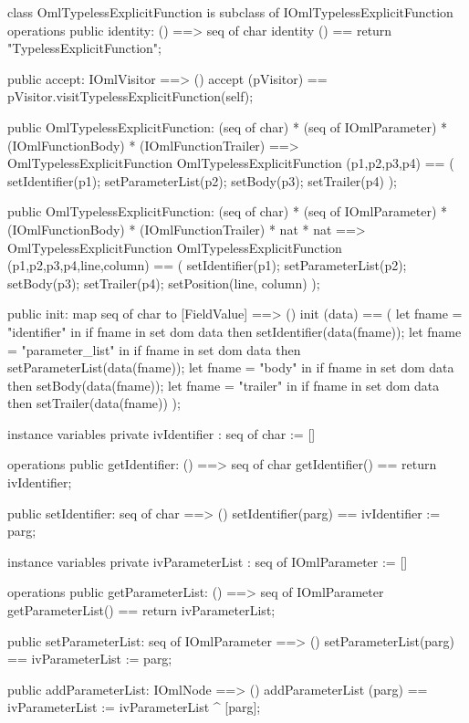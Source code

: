 \begin{vdm_al}
class OmlTypelessExplicitFunction is subclass of IOmlTypelessExplicitFunction
operations
  public identity: () ==> seq of char
  identity () == return "TypelessExplicitFunction";

  public accept: IOmlVisitor ==> ()
  accept (pVisitor) == pVisitor.visitTypelessExplicitFunction(self);

  public OmlTypelessExplicitFunction:
    (seq of char) *
    (seq of IOmlParameter) *
    (IOmlFunctionBody) *
    (IOmlFunctionTrailer) ==> OmlTypelessExplicitFunction
  OmlTypelessExplicitFunction (p1,p2,p3,p4) == 
    ( setIdentifier(p1);
      setParameterList(p2);
      setBody(p3);
      setTrailer(p4) );

  public OmlTypelessExplicitFunction:
    (seq of char) *
    (seq of IOmlParameter) *
    (IOmlFunctionBody) *
    (IOmlFunctionTrailer) *
    nat *
    nat ==> OmlTypelessExplicitFunction
  OmlTypelessExplicitFunction (p1,p2,p3,p4,line,column) == 
    ( setIdentifier(p1);
      setParameterList(p2);
      setBody(p3);
      setTrailer(p4);
      setPosition(line, column) );

  public init: map seq of char to [FieldValue] ==> ()
  init (data) ==
    ( let fname = "identifier" in
        if fname in set dom data
        then setIdentifier(data(fname));
      let fname = "parameter_list" in
        if fname in set dom data
        then setParameterList(data(fname));
      let fname = "body" in
        if fname in set dom data
        then setBody(data(fname));
      let fname = "trailer" in
        if fname in set dom data
        then setTrailer(data(fname)) );

instance variables
  private ivIdentifier : seq of char := []

operations
  public getIdentifier: () ==> seq of char
  getIdentifier() == return ivIdentifier;

  public setIdentifier: seq of char ==> ()
  setIdentifier(parg) == ivIdentifier := parg;

instance variables
  private ivParameterList : seq of IOmlParameter := []

operations
  public getParameterList: () ==> seq of IOmlParameter
  getParameterList() == return ivParameterList;

  public setParameterList: seq of IOmlParameter ==> ()
  setParameterList(parg) == ivParameterList := parg;

  public addParameterList: IOmlNode ==> ()
  addParameterList (parg) == ivParameterList := ivParameterList ^ [parg];


\end{vdm_al}
